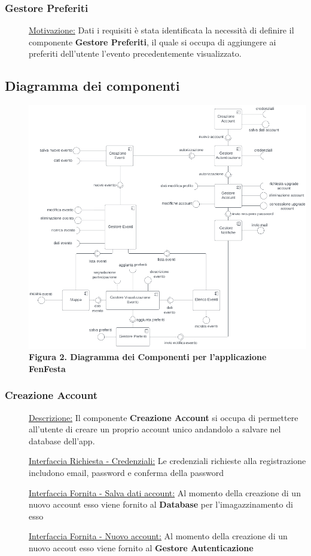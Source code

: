 \documentclass{article}
\begin{document}
\subsubsection{Gestore Preferiti}
\begin{description}
    \item[] \underline{Motivazione:}
        Dati i requisiti è stata identificata la necessità di definire il componente \textbf{Gestore Preferiti}, il quale si occupa di aggiungere ai preferiti dell'utente l'evento precedentemente visualizzato.
\end{description}
\clearpage
\subsection{Diagramma dei componenti}
\begin{description}
    \item[] \includegraphics[scale=0.6]{Component.png} \\
        \textbf{Figura 2. Diagramma dei Componenti per l'applicazione FenFesta} \label{fig:2}
\end{description}
\subsubsection{Creazione Account}
\begin{description}
    \item[] \underline{Descrizione:} Il componente \textbf{Creazione Account} si occupa di permettere all'utente di creare un proprio account unico andandolo a salvare nel database dell'app.
    \item[] \underline{Interfaccia Richiesta - Credenziali:} Le credenziali richieste alla registrazione includono email, password e conferma della password
    \item[] \underline{Interfaccia Fornita - Salva dati account:} Al momento della creazione di un nuovo account esso viene fornito al \textbf{Database} per l'imagazzinamento di esso
    \item[] \underline{Interfaccia Fornita - Nuovo account:} Al momento della creazione di un nuovo accout esso viene fornito al \textbf{Gestore Autenticazione}
\end{description}
\end{document}

